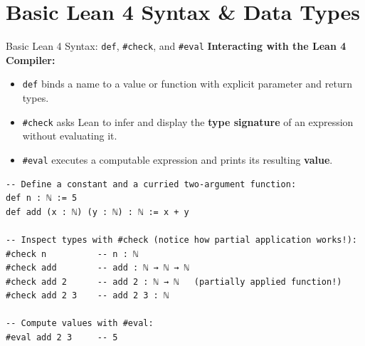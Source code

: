 \documentclass[aspectratio=169, 10pt]{beamer}
\begin{document}
\section{Basic Lean 4 Syntax \& Data Types}

\begin{frame}[fragile]{Basic Lean 4 Syntax: \texttt{def}, \texttt{\#check}, and \texttt{\#eval}}
  \textbf{Interacting with the Lean 4 Compiler:}
  \begin{itemize}
    \item \texttt{def} binds a name to a value or function with explicit parameter and return types.
    \item \texttt{\#check} asks Lean to infer and display the \textbf{type signature} of an expression without evaluating it.
    \item \texttt{\#eval} executes a computable expression and prints its resulting \textbf{value}.
  \end{itemize}

\begin{lstlisting}[language=Lean4]
-- Define a constant and a curried two-argument function:
def n : ℕ := 5
def add (x : ℕ) (y : ℕ) : ℕ := x + y

-- Inspect types with #check (notice how partial application works!):
#check n          -- n : ℕ
#check add        -- add : ℕ → ℕ → ℕ
#check add 2      -- add 2 : ℕ → ℕ   (partially applied function!)
#check add 2 3    -- add 2 3 : ℕ

-- Compute values with #eval:
#eval add 2 3     -- 5
\end{lstlisting}
\end{frame}
\end{document}

